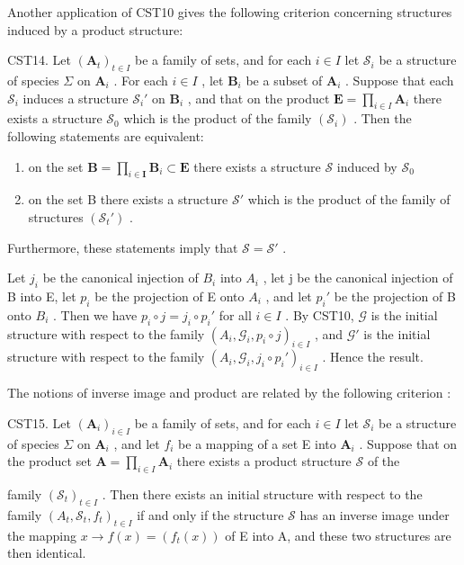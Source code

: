 Another application of CST10 gives the following criterion concerning structures induced by a product structure:

CST14. Let \((\mathbf{A}_{t})_{t\in I}\) be a family of sets, and for each \(i\in I\) let \(\mathcal{S}_i\) be a structure of species \(\Sigma\) on \(\mathbf{A}_i\) . For each \(i\in I\) , let \(\mathbf{B}_i\) be a subset of \(\mathbf{A}_i\) . Suppose that each \(\mathcal{S}_i\) induces a structure \(\mathcal{S}_i'\) on \(\mathbf{B}_i\) , and that on the product \(\mathbf{E} = \prod_{i\in I}\mathbf{A}_i\) there exists a structure \(\mathcal{S}_0\) which is the product of the family \((\mathcal{S}_i)\) . Then the following statements are equivalent:

\begin{enumerate}
\def\labelenumi{(\alph{enumi})}
\item
  on the set \(\mathbf{B} = \prod_{i\in \mathbf{I}}\mathbf{B}_i\subset \mathbf{E}\) there exists a structure \(\mathcal{S}\) induced by \(\mathcal{S}_0\)
\item
  on the set B there exists a structure \(\mathcal{S}'\) which is the product of the family of structures \((\mathcal{S}_t')\) .
\end{enumerate}

Furthermore, these statements imply that \(\mathcal{S} = \mathcal{S}'\) .

Let \(j_{i}\) be the canonical injection of \(B_{i}\) into \(A_{i}\) , let j be the canonical injection of B into E, let \(p_{i}\) be the projection of E onto \(A_{i}\) , and let \(p_{i}'\) be the projection of B onto \(B_{i}\) . Then we have \(p_{i} \circ j = j_{i} \circ p_{i}'\) for all \(i \in I\) . By CST10, \(\mathcal{G}\) is the initial structure with respect to the family \((A_{i}, \mathcal{G}_{i}, p_{i} \circ j)_{i \in I}\) , and \(\mathcal{G}'\) is the initial structure with respect to the family \((A_{i}, \mathcal{G}_{i}, j_{i} \circ p_{i}')_{i \in I}\) . Hence the result.

The notions of inverse image and product are related by the following criterion :

CST15. Let \((\mathbf{A}_i)_{i\in I}\) be a family of sets, and for each \(i\in I\) let \(\mathcal{S}_i\) be a structure of species \(\Sigma\) on \(\mathbf{A}_i\) , and let \(f_i\) be a mapping of a set E into \(\mathbf{A}_i\) . Suppose that on the product set \(\mathbf{A} = \prod_{i\in I}\mathbf{A}_i\) there exists a product structure \(\mathcal{S}\) of the

family \((\mathcal{S}_t)_{t\in I}\) . Then there exists an initial structure with respect to the family \((A_t,\mathcal{S}_t,f_t)_{t\in I}\) if and only if the structure \(\mathcal{S}\) has an inverse image under the mapping \(x\to f(x) = (f_t(x))\) of E into A, and these two structures are then identical.

